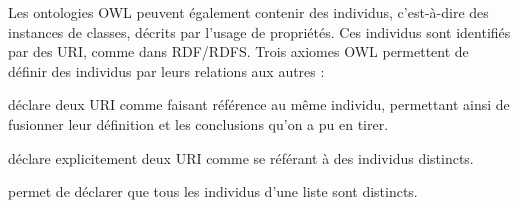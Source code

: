 Les ontologies OWL peuvent également contenir des individus, c'est-à-dire des instances de classes, décrits par l'usage de propriétés.
Ces individus sont identifiés par des URI, comme dans RDF/RDFS. 
Trois axiomes OWL permettent de définir des individus par leurs relations aux autres : 
\begin{liste}
  \item {} déclare deux URI comme faisant référence au même individu, permettant ainsi de fusionner leur définition et les conclusions qu'on a pu en tirer.
  \item {} déclare explicitement deux URI comme se référant à des individus distincts.
  \item {} permet de déclarer que tous les individus d'une liste sont distincts.
\end{liste}


 




